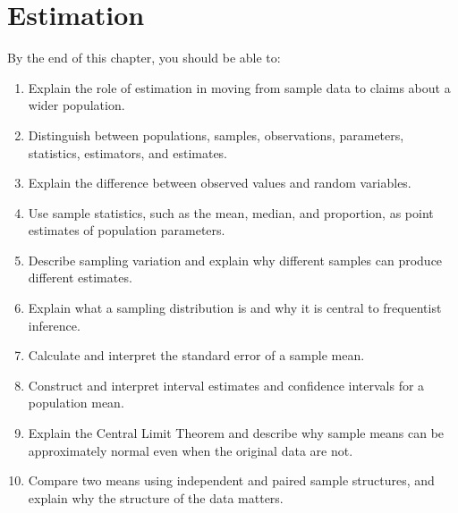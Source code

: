 \documentclass[
  letterpaper,
  DIV=11,
  numbers=noendperiod]{scrreprt}
\providecommand{\tightlist}{%
  \setlength{\itemsep}{0pt}\setlength{\parskip}{0pt}}
\begin{document}

\chapter{Estimation}\label{estimation}

\begin{tcolorbox}[enhanced jigsaw, arc=.35mm, bottomrule=.15mm, bottomtitle=1mm, breakable, colback=white, colbacktitle=quarto-callout-note-color!10!white, colframe=quarto-callout-note-color-frame, coltitle=black, left=2mm, leftrule=.75mm, opacityback=0, opacitybacktitle=0.6, rightrule=.15mm, title=\textcolor{quarto-callout-note-color}{\faInfo}\hspace{0.5em}{Learning Objectives}, titlerule=0mm, toprule=.15mm, toptitle=1mm]

By the end of this chapter, you should be able to:

\begin{enumerate}
\def\labelenumi{\arabic{enumi}.}
\tightlist
\item
  Explain the role of estimation in moving from sample data to claims
  about a wider population.
\item
  Distinguish between populations, samples, observations, parameters,
  statistics, estimators, and estimates.
\item
  Explain the difference between observed values and random variables.
\item
  Use sample statistics, such as the mean, median, and proportion, as
  point estimates of population parameters.
\item
  Describe sampling variation and explain why different samples can
  produce different estimates.
\item
  Explain what a sampling distribution is and why it is central to
  frequentist inference.
\item
  Calculate and interpret the standard error of a sample mean.
\item
  Construct and interpret interval estimates and confidence intervals
  for a population mean.
\item
  Explain the Central Limit Theorem and describe why sample means can be
  approximately normal even when the original data are not.
\item
  Compare two means using independent and paired sample structures, and
  explain why the structure of the data matters.
\end{enumerate}

\end{tcolorbox}
\end{document}
